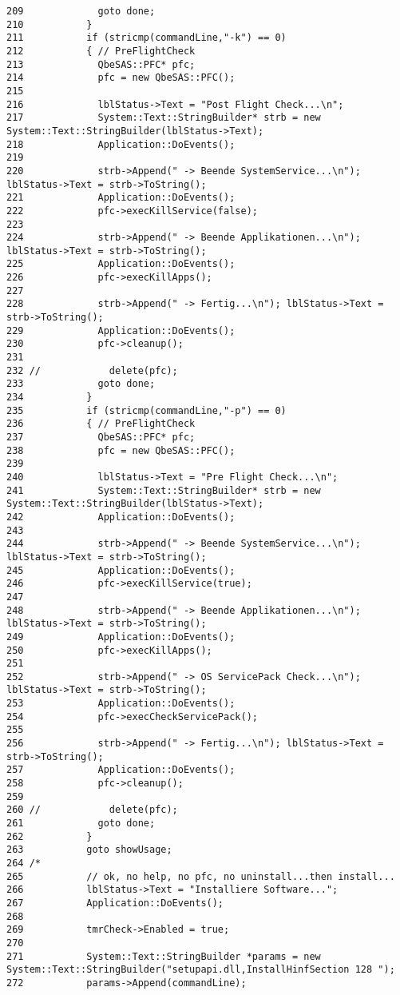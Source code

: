 \begin{verbatim}
209             goto done;
210           }
211           if (stricmp(commandLine,"-k") == 0)
212           { // PreFlightCheck
213             QbeSAS::PFC* pfc;
214             pfc = new QbeSAS::PFC();
215 
216             lblStatus->Text = "Post Flight Check...\n";
217             System::Text::StringBuilder* strb = new System::Text::StringBuilder(lblStatus->Text);
218             Application::DoEvents();
219 
220             strb->Append(" -> Beende SystemService...\n"); lblStatus->Text = strb->ToString();
221             Application::DoEvents();
222             pfc->execKillService(false);
223 
224             strb->Append(" -> Beende Applikationen...\n"); lblStatus->Text = strb->ToString();
225             Application::DoEvents();
226             pfc->execKillApps();
227 
228             strb->Append(" -> Fertig...\n"); lblStatus->Text = strb->ToString();
229             Application::DoEvents();
230             pfc->cleanup();
231 
232 //            delete(pfc);
233             goto done;
234           }
235           if (stricmp(commandLine,"-p") == 0)
236           { // PreFlightCheck
237             QbeSAS::PFC* pfc;
238             pfc = new QbeSAS::PFC();
239 
240             lblStatus->Text = "Pre Flight Check...\n";
241             System::Text::StringBuilder* strb = new System::Text::StringBuilder(lblStatus->Text);
242             Application::DoEvents();
243 
244             strb->Append(" -> Beende SystemService...\n"); lblStatus->Text = strb->ToString();
245             Application::DoEvents();
246             pfc->execKillService(true);
247 
248             strb->Append(" -> Beende Applikationen...\n"); lblStatus->Text = strb->ToString();
249             Application::DoEvents();
250             pfc->execKillApps();
251 
252             strb->Append(" -> OS ServicePack Check...\n"); lblStatus->Text = strb->ToString();
253             Application::DoEvents();
254             pfc->execCheckServicePack();
255 
256             strb->Append(" -> Fertig...\n"); lblStatus->Text = strb->ToString();
257             Application::DoEvents();
258             pfc->cleanup();
259 
260 //            delete(pfc);
261             goto done;
262           }
263           goto showUsage;
264 /*
265           // ok, no help, no pfc, no uninstall...then install...
266           lblStatus->Text = "Installiere Software...";
267           Application::DoEvents();
268 
269           tmrCheck->Enabled = true;
270 
271           System::Text::StringBuilder *params = new System::Text::StringBuilder("setupapi.dll,InstallHinfSection 128 ");
272           params->Append(commandLine);

\end{verbatim}
